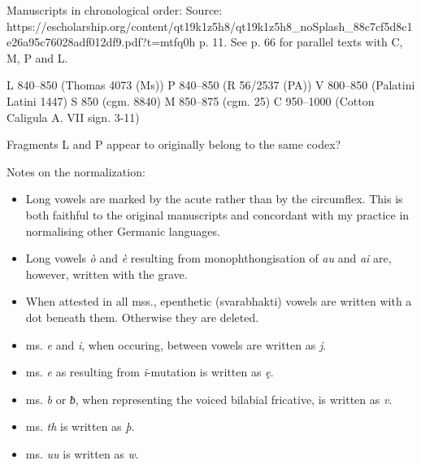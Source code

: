 
Manuscripts in chronological order:
  Source: https://escholarship.org/content/qt19k1z5h8/qt19k1z5h8_noSplash_88c7cf5d8c1e26a95c76028adf012df9.pdf?t=mtfq0h p. 11.
  See p. 66 for parallel texts with C, M, P and L.


  L 840–850 (Thomas 4073 (Ms))
  P 840–850 (R 56/2537 (PA))
  V 800–850 (Palatini Latini 1447)
  S 850 (cgm. 8840)
  M 850–875 (cgm. 25)
  C 950–1000 (Cotton Caligula A. VII sign. 3-11)

Fragments L and P appear to originally belong to the same codex?


Notes on the normalization:
  \begin{itemize}
    \item Long vowels are marked by the acute rather than by the circumflex. This is both faithful to the original manuscripts and concordant with my practice in normalising other Germanic languages.
    \item Long vowels \emph{ò} and \emph{è} resulting from monophthongisation of \emph{au} and \emph{ai} are, however, written with the grave.
    \item When attested in all mss., epenthetic (svarabhakti) vowels are written with a dot beneath them. Otherwise they are deleted.
    \item ms. \emph{e} and \emph{i}, when occuring, between vowels are written as \emph{j}.
    \item ms. \emph{e} as resulting from \emph{i}-mutation is written as \emph{ę}.
    \item ms. \emph{b} or \emph{ƀ}, when representing the voiced bilabial fricative, is written as \emph{v}.
    \item ms. \emph{th} is written as \emph{þ}.
    \item ms. \emph{uu} is written as \emph{w}.
  \end{itemize}

\sectionline

